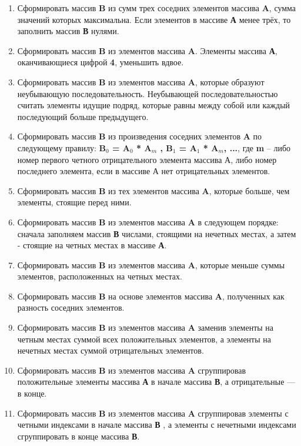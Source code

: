 \begin{enumerate}
    \item Сформировать массив \textbf{B} из сумм трех соседних элементов массива \textbf{A}, сумма значений которых максимальна. Если элементов в массиве \textbf{А} менее трёх, то заполнить массив \textbf{В} нулями.
    \item Сформировать массив \textbf{B} из элементов массива \textbf{A}. Элементы массива \textbf{А}, оканчивающиеся цифрой \textbf{4}, уменьшить вдвое.
    \item Сформировать массив \textbf{B} из элементов массива \textbf{A}, которые образуют неубывающую последовательность. Неубывающей последовательностью считать элементы идущие подряд, которые равны между собой или каждый последующий больше предыдущего.
    \item Сформировать массив \textbf{B} из произведения соседних элементов \textbf{A} по следующему правилу: \textbf{B$_0$ = A$_0$ * A$_m$ , B$_1$ = A$_1$ * A$_m$, ...}, где \textbf{m} – либо номер первого четного отрицательного элемента массива А, либо номер последнего элемента, если в массиве А нет отрицательных элементов.
    \item Сформировать массив \textbf{B} из тех элементов массива \textbf{A}, которые больше, чем элементы, стоящие перед ними.
    \item Сформировать массив \textbf{B} из элементов массива \textbf{A} в следующем порядке: сначала заполняем массив \textbf{В} числами, стоящими на нечетных местах, а затем - стоящие на четных местах в массиве \textbf{А}.
    \item Сформировать массив \textbf{B} из элементов массива \textbf{A}, которые меньше суммы элементов, расположенных на четных местах.
    \item Сформировать массив \textbf{B} на основе элементов массива \textbf{A}, полученных как разность соседних элементов.
    \item Сформировать массив \textbf{B} из элементов массива \textbf{A} заменив элементы на четным местах суммой всех положительных элементов, а элементы на нечетных местах суммой отрицательных элементов.
    \item Сформировать массив \textbf{B} из элементов массива \textbf{A} сгруппировав положительные элементы массива \textbf{А} в начале массива \textbf{В}, а отрицательные --- в конце.
    \item Сформировать массив \textbf{B} из элементов массива \textbf{A} сгруппировав элементы с четными индексами в начале массива \textbf{В} , а элементы с нечетными индексами сгруппировать в конце массива \textbf{В}.

\end{enumerate}
